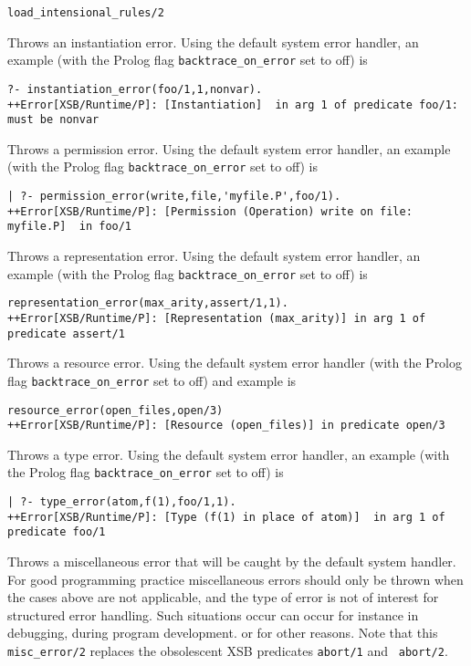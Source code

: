 \begin{description}
{\begin{verbatim}
load_intensional_rules/2
\end{verbatim}
}
%
%
Throws an instantiation error.  Using the default system error
handler, an example (with the Prolog flag {\tt backtrace\_on\_error}
set to off) is {\small
\begin{verbatim}
?- instantiation_error(foo/1,1,nonvar).
++Error[XSB/Runtime/P]: [Instantiation]  in arg 1 of predicate foo/1: must be nonvar
\end{verbatim}
}
%
%
Throws a permission error.  Using the default system error handler, an
example (with the Prolog flag {\tt backtrace\_on\_error} set to off)
is {\small
\begin{verbatim}
| ?- permission_error(write,file,'myfile.P',foo/1).
++Error[XSB/Runtime/P]: [Permission (Operation) write on file: myfile.P]  in foo/1
\end{verbatim}
}
%
% 
Throws a representation error.  Using the default system error handler, an
example (with the Prolog flag {\tt backtrace\_on\_error} set to off) is {\small
\begin{verbatim}
representation_error(max_arity,assert/1,1).
++Error[XSB/Runtime/P]: [Representation (max_arity)] in arg 1 of predicate assert/1
\end{verbatim} }
%
%
Throws a resource error.  Using the default system error handler
(with the Prolog flag {\tt backtrace\_on\_error} set to off) and example is {\small
\begin{verbatim}
resource_error(open_files,open/3)
++Error[XSB/Runtime/P]: [Resource (open_files)] in predicate open/3
\end{verbatim} }
%
%
Throws a type error.  Using the default system error handler, an
example (with the Prolog flag {\tt backtrace\_on\_error} set to off)
is {\small
\begin{verbatim}
| ?- type_error(atom,f(1),foo/1,1).
++Error[XSB/Runtime/P]: [Type (f(1) in place of atom)]  in arg 1 of predicate foo/1
\end{verbatim}
}
%
%
Throws a miscellaneous error that will be caught by the default system
handler.  For good programming practice miscellaneous errors should
only be thrown when the cases above are not applicable, and the type
of error is not of interest for structured error handling.  Such
situations occur can occur for instance in debugging, during program
development. or for other reasons.  Note that this {\tt misc\_error/2}
replaces the obsolescent XSB predicates {\tt abort/1} and {\tt
  abort/2}.
%
\end{description}
